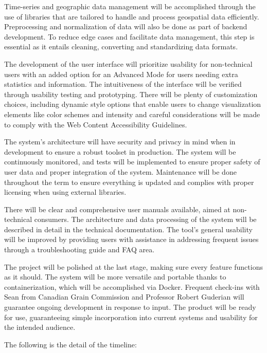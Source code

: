 \documentclass[12pt]{article}
\begin{document}
Time-series and geographic data management will be accomplished through the use of libraries that are tailored to handle and process geospatial data efficiently. Preprocessing and normalization of data will also be done as part of backend development. To reduce edge cases and facilitate data management, this step is essential as it entails cleaning, converting and standardizing data formats.  

The development of the user interface will prioritize usability for non-technical users with an added option for an Advanced Mode for users needing extra statistics and information. The intuitiveness of the interface will be verified through usability testing and prototyping. There will be plenty of customization choices, including dynamic style options that enable users to change visualization elements like color schemes and intensity and careful considerations will be made to comply with the Web Content Accessibility Guidelines.  

The system’s architecture will have security and privacy in mind when in development to ensure a robust toolset in production. The system will be continuously monitored, and tests will be implemented to ensure proper safety of user data and proper integration of the system. Maintenance will be done throughout the term to ensure everything is updated and complies with proper licensing when using external libraries. 

There will be clear and comprehensive user manuals available, aimed at non-technical consumers. The architecture and data processing of the system will be described in detail in the technical documentation. The tool's general usability will be improved by providing users with assistance in addressing frequent issues through a troubleshooting guide and FAQ area.

The project will be polished at the last stage, making sure every feature functions as it should. The system will be more versatile and portable thanks to containerization, which will be accomplished via Docker. Frequent check-ins with Sean from Canadian Grain Commission and Professor Robert Guderian will guarantee ongoing development in response to input. The product will be ready for use, guaranteeing simple incorporation into current systems and usability for the intended audience.

The following is the detail of the timeline:
\end{document}
